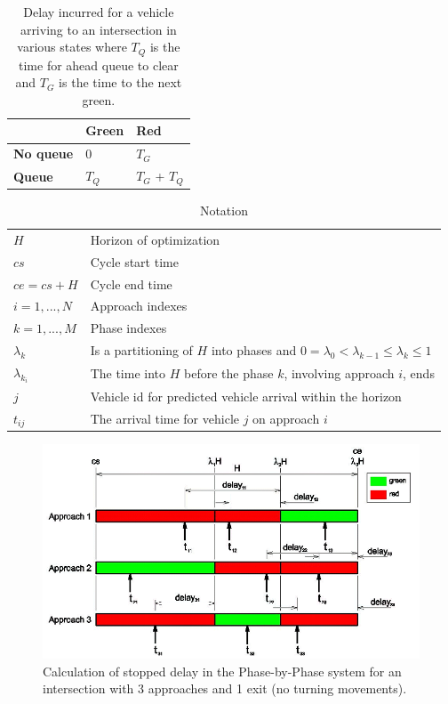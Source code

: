 \documentclass [a4paper, 10pt]{article}
\begin{document}
\begin{table}[!ht]
\begin{center}
\begin{tabular}{l|ll}
 & \textbf{Green} & \textbf{Red} \\ \hline
\textbf{No queue} & 0 & $T_G$ \\
\textbf{Queue} & $T_Q$ & $T_G$ + $T_Q$
\end{tabular}
\end{center}
\caption{Delay incurred for a vehicle arriving to an intersection in various states where $T_Q$ is the time for ahead queue to clear and $T_G$ is the time to the next green.}
\label{tbl:delaycases}
\end{table}


\begin{table}[!ht]
\begin{center}
\begin{tabular}{ll}
\hline
$H$ & Horizon of optimization \\
$cs$ & Cycle start time \\
$ce = cs+H$ & Cycle end time \\
$i = 1,...,N$ & Approach indexes \\
$k = 1,...,M$ & Phase indexes \\
$\lambda_k$ &  Is a partitioning of $H$ into phases and $0 = \lambda_{0} <  \lambda_{k-1} \leq \lambda_k \leq 1$ \\
$\lambda_{k_i}$ & The time into $H$ before the phase $k$, involving approach $i$, ends \\
$j$ & Vehicle id for predicted vehicle arrival within the horizon  \\
$t_{ij}$ & The arrival time for vehicle $j$ on approach $i$
\\ \hline
\end{tabular}
\end{center}
\caption{Notation}
\end{table}

\begin{figure}[!ht]
\begin{center}
\includegraphics[scale=0.35]{phase-by-phase_delay-model.png} 
\end{center}
\caption{Calculation of stopped delay in the Phase-by-Phase system for an intersection with 3 approaches and 1 exit (no turning movements).}
\label{fig:pp_delay}
\end{figure}
\end{document}

